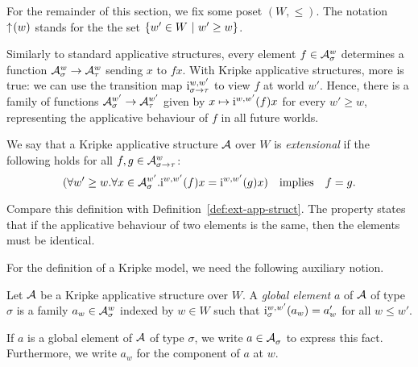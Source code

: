 For the remainder of this section, we fix some poset $(W, \le)$.
The notation $\uparrow\hspace{-2pt}(w)$ stands for the the set $\left\{ w' \in W \ |\  w' \ge w \right\}$.

Similarly to standard applicative structures, every element $f \in \mathcal{A}_{\sigma}^{w}$ determines a function $\mathcal{A}_{\sigma}^{w} \to \mathcal{A}_{\tau}^{w}$ sending $x$ to $f x$. With Kripke applicative structures, more is true: we can use the transition map $\kstran[\functy{\sigma}{\tau}][w,w']$ to view $f$ at world $w'$. Hence, there is a family of functions $\mathcal{A}_{\sigma}^{w'} \to \mathcal{A}_{\tau}^{w'}$ given by $x \mapsto \kstran[][w,w'](f) x$ for every $w' \ge w$, representing the applicative behaviour of $f$ in all future worlds.

\begin{defn}
We say that a Kripke applicative structure $\mathcal{A}$ over $W$ is \emph{extensional} if the following holds for all $f, g \in \mathcal{A}_{\sigma \to \tau}^{w}$:
\[ (\forall w' \ge w. \forall x \in \kscomp{\struct{A}}{\sigma}{w'}.
        \kstran[][w,w'](f)x = \kstran[][w,w'](g)x)
    \quad\text{implies}\quad f = g. \]
\end{defn}

\begin{rem}
Compare this definition with Definition~\ref{def:ext-app-struct}. The property states that if the applicative behaviour of two elements is the same, then the elements must be identical.
\end{rem}

For the definition of a Kripke model, we need the following auxiliary notion.

\begin{defn}
Let $\mathcal{A}$ be a Kripke applicative structure over $W$. A \emph{global element} $a$ of $\mathcal{A}$ of type $\sigma$ is a family $a_w \in \mathcal{A}_{\sigma}^{w}$ indexed by $w \in W$ such that $\kstran[\sigma][w,w'](a_w) = a_w'$ for all $w \le w'$.
\end{defn}


If $a$ is a global element of $\mathcal{A}$ of type $\sigma$, we write $a \in \mathcal{A}_{\sigma}^{}$ to express this fact. Furthermore, we write $a_w$ for the component of $a$ at $w$.

